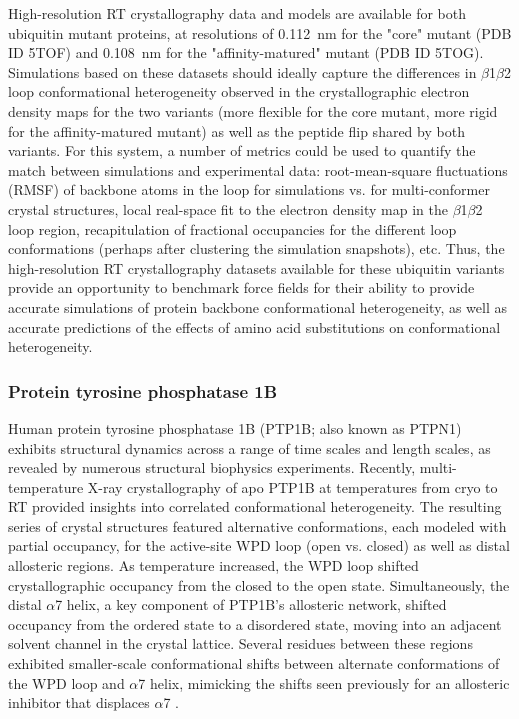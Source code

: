 \documentclass[9pt,review]{livecoms}
\begin{document}
High-resolution RT crystallography data and models are available for both ubiquitin mutant proteins, at resolutions of \qty{0.112}{\nano\meter} for the "core" mutant (PDB ID 5TOF) and \qty{0.108}{\nano\meter} for the "affinity-matured" mutant (PDB ID 5TOG).
Simulations based on these datasets should ideally capture the differences in $\beta$1$\beta$2 loop conformational heterogeneity observed in the crystallographic electron density maps for the two variants (more flexible for the core mutant, more rigid for the affinity-matured mutant) as well as the peptide flip shared by both variants.
For this system, a number of metrics could be used to quantify the match between simulations and experimental data: root-mean-square fluctuations (RMSF) of backbone atoms in the loop for simulations vs. for multi-conformer crystal structures, local real-space fit to the electron density map in the $\beta$1$\beta$2 loop region, recapitulation of fractional occupancies for the different loop conformations (perhaps after clustering the simulation snapshots), etc.
Thus, the high-resolution RT crystallography datasets available for these ubiquitin variants provide an opportunity to benchmark force fields for their ability to provide accurate simulations of protein backbone conformational heterogeneity, as well as accurate predictions of the effects of amino acid substitutions on conformational heterogeneity.

\subsubsection{Protein tyrosine phosphatase 1B}
\label{sub2:ptp1b}

Human protein tyrosine phosphatase 1B (PTP1B; also known as PTPN1) exhibits structural dynamics across a range of time scales and length scales, as revealed by numerous structural biophysics experiments.
Recently, multi-temperature X-ray crystallography of apo PTP1B at temperatures from cryo to RT \cite{keedy_expanded_2018} provided insights into correlated conformational heterogeneity.
The resulting series of crystal structures featured alternative conformations, each modeled with partial occupancy, for the active-site WPD loop (open vs. closed) as well as distal allosteric regions.
As temperature increased, the WPD loop shifted crystallographic occupancy from the closed to the open state.
Simultaneously, the distal $\alpha$7 helix, a key component of PTP1B’s allosteric network, shifted occupancy from the ordered state to a disordered state, moving into an adjacent solvent channel in the crystal lattice.
Several residues between these regions exhibited smaller-scale conformational shifts between alternate conformations of the WPD loop and $\alpha$7 helix, mimicking the shifts seen previously for an allosteric inhibitor that displaces $\alpha$7 \cite{wiesmann_allosteric_2004}.
\end{document}
